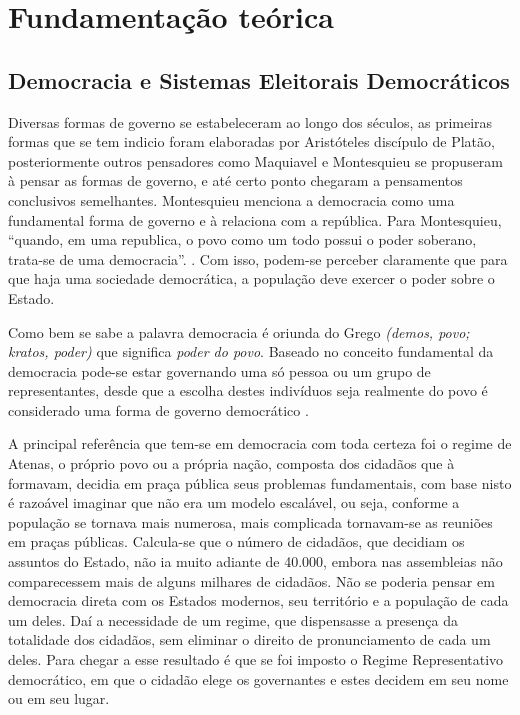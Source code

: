 \section{Fundamentação teórica}
\subsection{Democracia e Sistemas Eleitorais Democráticos}
Diversas formas de governo se estabeleceram ao longo dos séculos, 
as primeiras formas que se tem indicio foram elaboradas por Aristóteles discípulo
de Platão, posteriormente outros pensadores como Maquiavel e Montesquieu se propuseram
à pensar as formas de governo, e até certo ponto chegaram a pensamentos conclusivos semelhantes.
Montesquieu menciona a democracia como uma fundamental forma de governo e à relaciona
com a república. 
Para Montesquieu, “quando, em uma republica, o povo como um todo possui o poder soberano,
trata-se de uma democracia”. \cite{de1857oeuvres}. Com isso, podem-se perceber 
claramente que para que haja uma sociedade democrática, a população deve exercer
o poder sobre o Estado. \par
Como bem se sabe a palavra democracia é oriunda do Grego \emph{(demos, povo; kratos, poder)} 
que significa \emph{poder do povo}. Baseado no conceito fundamental da democracia
pode-se estar governando uma só pessoa ou um grupo de representantes, desde que
a escolha destes indivíduos seja realmente do povo é considerado uma forma de governo
democrático \cite[A democracia]{ribeiro2001democracia}. \par 
A principal referência que tem-se em democracia com toda certeza foi o regime de Atenas, 
o próprio povo ou a própria nação, composta dos cidadãos que à formavam,
decidia em praça pública seus problemas fundamentais, com base nisto é razoável
imaginar que não era um modelo escalável, ou seja, conforme a população se tornava 
mais numerosa, mais complicada tornavam-se as reuniões em praças públicas. 
Calcula-se que o número de cidadãos, que decidiam os assuntos do Estado,
não ia muito adiante de 40.000, embora nas assembleias não comparecessem mais de
alguns milhares de cidadãos. Não se poderia pensar em democracia direta com os
Estados modernos, seu território e a população de cada um deles. 
Daí a necessidade de um regime, que dispensasse a presença da totalidade dos 
cidadãos, sem eliminar o direito de pronunciamento de cada um deles. 
Para chegar a esse resultado é que se foi imposto o Regime Representativo democrático,
em que o cidadão elege os governantes e estes decidem em seu nome ou em seu lugar.
